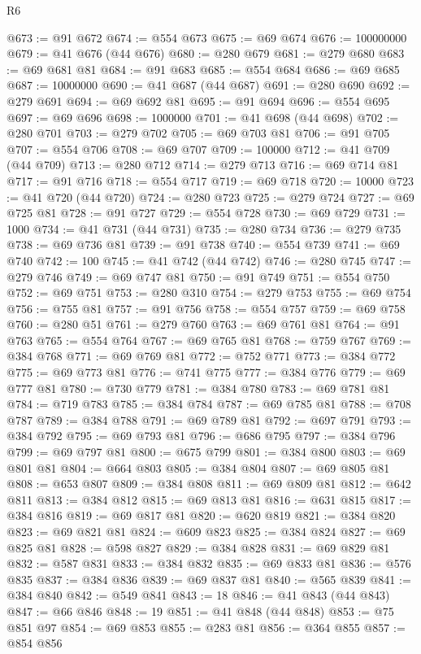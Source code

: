 \begin{lexlean}{R6}
\begin{coremodule}
@673 := @91 @672
@674 := @554 @673
@675 := @69 @674
@676 := 100000000
@679 := @41 @676 (@44 @676)
@680 := @280 @679
@681 := @279 @680
@683 := @69 @681 @81
@684 := @91 @683
@685 := @554 @684
@686 := @69 @685
@687 := 10000000
@690 := @41 @687 (@44 @687)
@691 := @280 @690
@692 := @279 @691
@694 := @69 @692 @81
@695 := @91 @694
@696 := @554 @695
@697 := @69 @696
@698 := 1000000
@701 := @41 @698 (@44 @698)
@702 := @280 @701
@703 := @279 @702
@705 := @69 @703 @81
@706 := @91 @705
@707 := @554 @706
@708 := @69 @707
@709 := 100000
@712 := @41 @709 (@44 @709)
@713 := @280 @712
@714 := @279 @713
@716 := @69 @714 @81
@717 := @91 @716
@718 := @554 @717
@719 := @69 @718
@720 := 10000
@723 := @41 @720 (@44 @720)
@724 := @280 @723
@725 := @279 @724
@727 := @69 @725 @81
@728 := @91 @727
@729 := @554 @728
@730 := @69 @729
@731 := 1000
@734 := @41 @731 (@44 @731)
@735 := @280 @734
@736 := @279 @735
@738 := @69 @736 @81
@739 := @91 @738
@740 := @554 @739
@741 := @69 @740
@742 := 100
@745 := @41 @742 (@44 @742)
@746 := @280 @745
@747 := @279 @746
@749 := @69 @747 @81
@750 := @91 @749
@751 := @554 @750
@752 := @69 @751
@753 := @280 @310
@754 := @279 @753
@755 := @69 @754
@756 := @755 @81
@757 := @91 @756
@758 := @554 @757
@759 := @69 @758
@760 := @280 @51
@761 := @279 @760
@763 := @69 @761 @81
@764 := @91 @763
@765 := @554 @764
@767 := @69 @765 @81
@768 := @759 @767
@769 := @384 @768
@771 := @69 @769 @81
@772 := @752 @771
@773 := @384 @772
@775 := @69 @773 @81
@776 := @741 @775
@777 := @384 @776
@779 := @69 @777 @81
@780 := @730 @779
@781 := @384 @780
@783 := @69 @781 @81
@784 := @719 @783
@785 := @384 @784
@787 := @69 @785 @81
@788 := @708 @787
@789 := @384 @788
@791 := @69 @789 @81
@792 := @697 @791
@793 := @384 @792
@795 := @69 @793 @81
@796 := @686 @795
@797 := @384 @796
@799 := @69 @797 @81
@800 := @675 @799
@801 := @384 @800
@803 := @69 @801 @81
@804 := @664 @803
@805 := @384 @804
@807 := @69 @805 @81
@808 := @653 @807
@809 := @384 @808
@811 := @69 @809 @81
@812 := @642 @811
@813 := @384 @812
@815 := @69 @813 @81
@816 := @631 @815
@817 := @384 @816
@819 := @69 @817 @81
@820 := @620 @819
@821 := @384 @820
@823 := @69 @821 @81
@824 := @609 @823
@825 := @384 @824
@827 := @69 @825 @81
@828 := @598 @827
@829 := @384 @828
@831 := @69 @829 @81
@832 := @587 @831
@833 := @384 @832
@835 := @69 @833 @81
@836 := @576 @835
@837 := @384 @836
@839 := @69 @837 @81
@840 := @565 @839
@841 := @384 @840
@842 := @549 @841
@843 := 18
@846 := @41 @843 (@44 @843)
@847 := @66 @846
@848 := 19
@851 := @41 @848 (@44 @848)
@853 := @75 @851 @97
@854 := @69 @853
@855 := @283 @81
@856 := @364 @855
@857 := @854 @856

\end{coremodule}
\end{lexlean}
